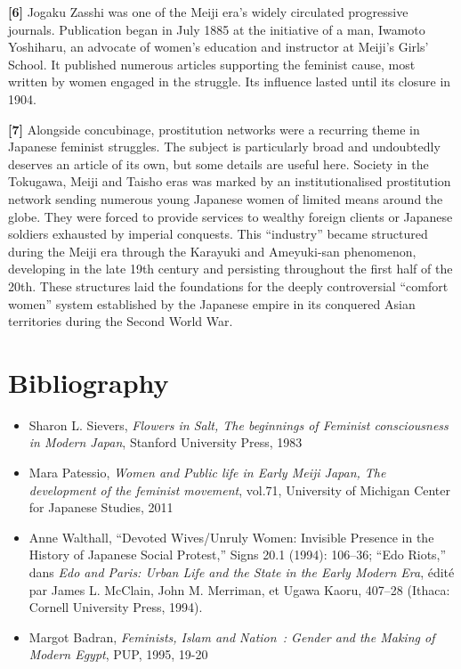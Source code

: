 \documentclass[11pt,a4paper]{article}
\begin{document}
\textbf{{[}6{]}} Jogaku Zasshi was one of the Meiji era's widely circulated progressive journals. Publication began in July 1885 at the initiative of a man, Iwamoto Yoshiharu, an advocate of women's education and instructor at Meiji's Girls' School. It published numerous articles supporting the feminist cause, most written by women engaged in the struggle. Its influence lasted until its closure in 1904.

\textbf{{[}7{]}} Alongside concubinage, prostitution networks were a recurring theme in Japanese feminist struggles. The subject is particularly broad and undoubtedly deserves an article of its own, but some details are useful here. Society in the Tokugawa, Meiji and Taisho eras was marked by an institutionalised prostitution network sending numerous young Japanese women of limited means around the globe. They were forced to provide services to wealthy foreign clients or Japanese soldiers exhausted by imperial conquests. This ``industry'' became structured during the Meiji era through the Karayuki and Ameyuki-san phenomenon, developing in the late 19th century and persisting throughout the first half of the 20th. These structures laid the foundations for the deeply controversial ``comfort women'' system established by the Japanese empire in its conquered Asian territories during the Second World War.

\section{Bibliography}
\small

\begin{itemize}[leftmargin=1.3em,itemsep=.18em,topsep=.25em]
\item
  Sharon L. Sievers, \emph{Flowers in Salt, The beginnings of Feminist consciousness in Modern Japan}, Stanford University Press, 1983
\item
  Mara Patessio, \emph{Women and Public life in Early Meiji Japan, The development of the feminist movement}, vol.71, University of Michigan Center for Japanese Studies, 2011
\item
  Anne Walthall, “Devoted Wives/Unruly Women: Invisible Presence in the History of Japanese Social Protest,” Signs 20.1 (1994): 106–36; “Edo Riots,” dans \emph{Edo and Paris: Urban Life and the State in the Early Modern Era}, édité par James L. McClain, John M. Merriman, et Ugawa Kaoru, 407–28 (Ithaca: Cornell University Press, 1994).
\item
  Margot Badran, \emph{Feminists, Islam and Nation~: Gender and the Making of Modern Egypt}, PUP, 1995, 19-20
\end{itemize}
\end{document}
